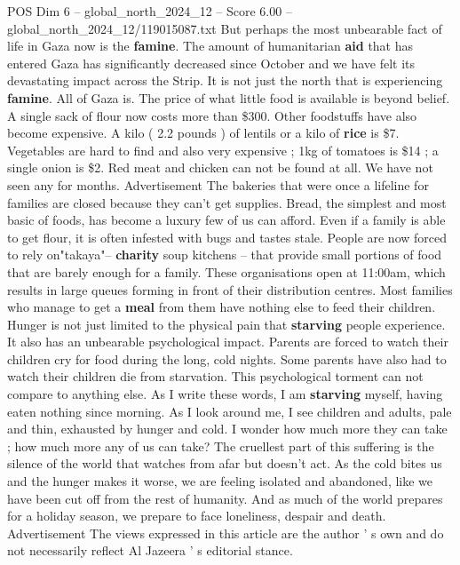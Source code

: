 \begin{textsample}{POS Dim 6 – global\_north\_2024\_12 – Score 6.00 – global\_north\_2024\_12/119015087.txt}
But perhaps the most unbearable fact of life in Gaza now is the \textbf{famine}.
The amount of humanitarian \textbf{aid} that has entered Gaza has significantly decreased since October and we have felt its devastating impact across the Strip.
It is not just the north that is experiencing \textbf{famine}.
All of Gaza is.
The price of what little food is available is beyond belief.
A single sack of flour now costs more than \$300.
Other foodstuffs have also become expensive.
A kilo ( 2.2 pounds ) of lentils or a kilo of \textbf{rice} is \$7.
Vegetables are hard to find and also very expensive ; 1kg of tomatoes is \$14 ; a single onion is \$2.
Red meat and chicken can not be found at all.
We have not seen any for months.
Advertisement The bakeries that were once a lifeline for families are closed because they can't get supplies.
Bread, the simplest and most basic of foods, has become a luxury few of us can afford.
Even if a family is able to get flour, it is often infested with bugs and tastes stale.
People are now forced to rely on"takaya"-- \textbf{charity} soup kitchens -- that provide small portions of food that are barely enough for a family.
These organisations open at 11:00am, which results in large queues forming in front of their distribution centres.
Most families who manage to get a \textbf{meal} from them have nothing else to feed their children.
Hunger is not just limited to the physical pain that \textbf{starving} people experience.
It also has an unbearable psychological impact.
Parents are forced to watch their children cry for food during the long, cold nights.
Some parents have also had to watch their children die from starvation.
This psychological torment can not compare to anything else.
As I write these words, I am \textbf{starving} myself, having eaten nothing since morning.
As I look around me, I see children and adults, pale and thin, exhausted by hunger and cold.
I wonder how much more they can take ; how much more any of us can take?
The cruellest part of this suffering is the silence of the world that watches from afar but doesn't act.
As the cold bites us and the hunger makes it worse, we are feeling isolated and abandoned, like we have been cut off from the rest of humanity.
And as much of the world prepares for a holiday season, we prepare to face loneliness, despair and death.
Advertisement The views expressed in this article are the author ' s own and do not necessarily reflect Al Jazeera ' s editorial stance.

\end{textsample}
